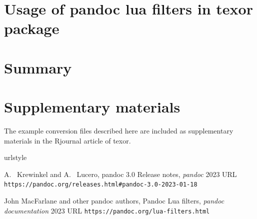 \section{Usage of pandoc lua filters in texor package}


\section{Summary}

\section{Supplementary materials}
The example conversion files described here are included as supplementary materials
in the Rjournal article of texor.

\begin{thebibliography}{2}
    \providecommand{\natexlab}[1]{#1}
    \providecommand{\url}[1]{\texttt{#1}}
    \expandafter\ifx\csname urlstyle\endcsname\relax
      \providecommand{\doi}[1]{doi: #1}\else
      \providecommand{\doi}{doi: \begingroup \urlstyle{rm}\Url}\fi

A.~ Krewinkel and A.~ Lucero,
\newblock pandoc 3.0 Release notes,
\newblock \emph{pandoc}  2023
\newblock URL \url{https://pandoc.org/releases.html#pandoc-3.0-2023-01-18}

John MacFarlane and other pandoc authors,
\newblock Pandoc Lua filters,
\newblock \emph{pandoc documentation}  2023
\newblock URL \url{https://pandoc.org/lua-filters.html}

\end{thebibliography}


\address{%
Abhishek Ulayil\\
Student, Institute of Actuaries of India\\%
Mumbai, India\\
ORCiD: 0009-0000-6935-8690\\
}
